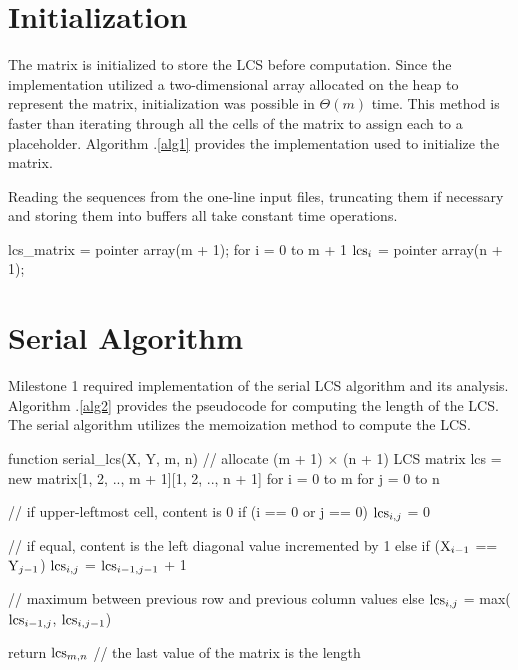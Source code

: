 \documentclass[usletter, 11pt]{extarticle}
\newcommand{\V}[1]{\textup{#1}}
\newcommand{\lcs}{\V{lcs}}
\newcommand{\seqone}{\V{X}}
\newcommand{\seqtwo}{\V{Y}}
\begin{document}
    \section{Initialization} The matrix is initialized to store the LCS before
    computation. Since the implementation utilized a two-dimensional array
    allocated on the heap to represent the matrix, initialization was possible
    in $\Theta(m)$ time. This method is faster than iterating through all the
    cells of the matrix to assign each to a placeholder. Algorithm
    \thesection .\ref{alg1} provides the implementation used to initialize the
    matrix.

    Reading the sequences from the one-line input files, truncating them if
    necessary and storing them into buffers all take constant time operations.
    \newpage

\begin{pseudocode}[caption={Initialization of the Longest Common Subsequence
Matrix}, label={alg1}]
lcs_matrix = pointer array(m + 1);
for i = 0 to m + 1
    $\lcs_{i}$ = pointer array(n + 1);

\end{pseudocode}

    \section{Serial Algorithm} Milestone 1 required implementation of the
    serial LCS algorithm and its analysis. Algorithm \thesection .\ref{alg2}
    provides the pseudocode for computing the length of the LCS. The serial
    algorithm utilizes the memoization method to compute the LCS.

\begin{pseudocode}[caption={Serial Longest Common Subsequence Length},
label={alg2}]
function serial_lcs(X, Y, m, n)
    // allocate (m + 1) $\times$ (n + 1) LCS matrix
    lcs = new matrix[1, 2, .., m + 1][1, 2, .., n + 1]
    for i = 0 to m
        for j = 0 to n

            // if upper-leftmost cell, content is 0
            if (i == 0 or j == 0)
                $\lcs_{i, j}$ = 0

            // if equal, content is the left diagonal value incremented by 1
            else if ($\seqone_{i - 1}$ == $\seqtwo_{j - 1}$)
                $\lcs_{i, j}$ = $\lcs_{i-1, j-1}$ + 1  

            // maximum between previous row and previous column values
            else
                $\lcs_{i, j}$ = max($\lcs_{i-1, j}$, $\lcs_{i, j-1}$)

    return $\lcs_{m,n}$  // the last value of the matrix is the length

\end{pseudocode}
\end{document}

